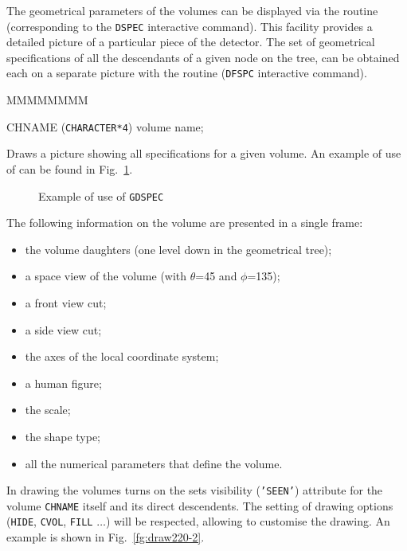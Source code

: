        
The geometrical parameters of the volumes can be displayed via the 
 routine (corresponding to the {\tt DSPEC} interactive 
command). This facility provides a detailed picture of a particular 
piece of the detector. 
The set of geometrical specifications 
of all the descendants of a given node on the tree, can be obtained
each on a separate picture with the routine  ({\tt DFSPC} 
interactive command).

\begin{DLtt}{MMMMMMMM}
\item[CHNAME] ({\tt CHARACTER*4}) volume name;
\end{DLtt}
Draws a picture showing all specifications for a given volume.
An example of use of  can be found in Fig.~\ref{fg:draw220-1}.

\begin{figure}[hbt]
     \centering
     \caption{Example of use of {\tt GDSPEC}}
     \label{fg:draw220-1}
\end{figure}

The following information on the volume are
presented in a single frame:
\begin{itemize}
\item the volume daughters (one level down in the geometrical tree);
\item a space view of the volume (with $\theta$=45 and $\phi$=135);
\item a front view cut; 
\item a side view cut; 
\item the axes of the local coordinate system;
\item a human figure;
\item the scale;
\item the shape type;
\item all the numerical parameters that define the volume.
\end{itemize}
In drawing the volumes  turns on the sets visibility 
({\tt 'SEEN'}) attribute for the volume {\tt CHNAME}
itself and its direct descendents. The setting of drawing options
({\tt HIDE}, {\tt CVOL}, {\tt FILL} $\ldots$) will be respected, allowing to 
customise the drawing. An example is shown in Fig.~\ref{fg:draw220-2}.
 
